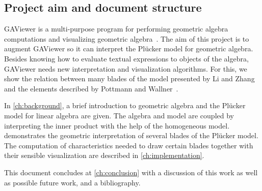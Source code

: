 %


\subsection{Project aim and document structure}

GAViewer is a multi-purpose program for performing geometric algebra computations and visualizing geometric algebra~\cite{GAViewer}.  The aim of this project is to augment GAViewer so it can interpret the Pl\"ucker model for geometric algebra.  Besides knowing how to evaluate textual expressions to objects of the algebra, GAViewer needs new interpretation and visualization algorithms.  For this, we show the relation between many blades of the model presented by Li and Zhang~\cite{Hongbo} and the elements described by Pottmann and Wallner~\cite{Pottmann}.

In \autoref{ch:background}, a brief introduction to geometric algebra and the Pl\"ucker model for linear algebra are given.  The algebra and model are coupled by interpreting the inner product with the help of the homogeneous model.   demonstrates the geometric interpretation of several blades of the Pl\"ucker model.  The computation of characteristics needed to draw certain blades together with their sensible visualization are described in \autoref{ch:implementation}.

This document concludes at \autoref{ch:conclusion} with a discussion of this work as well as possible future work, and a bibliography.


